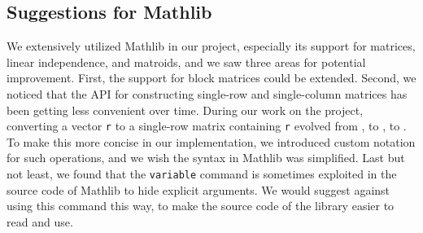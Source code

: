 \subsection{Suggestions for Mathlib}

We extensively utilized Mathlib in our project, especially its support for matrices, linear independence, and matroids, and we saw three areas for potential improvement. First, the support for block matrices could be extended. Second, we noticed that the API for constructing single-row and single-column matrices has been getting less convenient over time. During our work on the project, converting a vector \texttt{r} to a single-row matrix containing \texttt{r} evolved from , to , to . To make this more concise in our implementation, we introduced custom notation for such operations, and we wish the syntax in Mathlib was simplified. Last but not least, we found that the \texttt{variable} command is sometimes exploited in the source code of Mathlib to hide explicit arguments. We would suggest against using this command this way, to make the source code of the library easier to read and use.